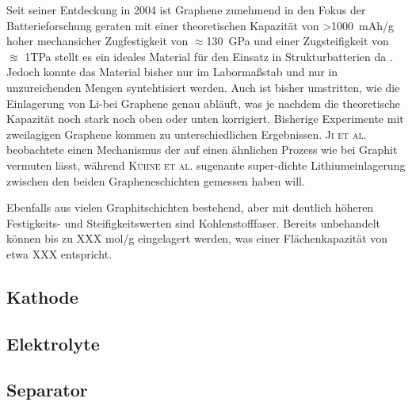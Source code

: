 Seit seiner Entdeckung in 2004 \cite{Novoselov2004} ist Graphene zunehmend in den Fokus der Batterieforschung geraten mit einer theoretischen Kapazität von >1000~mAh/g hoher mechansicher Zugfestigkeit von $\approx$130~GPa und einer Zugsteifigkeit von $\approxeq$ 1TPa stellt es ein ideales Material für den Einsatz in Strukturbatterien da \cite{Novoselov2012}. Jedoch konnte das Material bisher nur im Labormaßstab und nur in unzureichenden Mengen syntehtisiert werden. Auch ist bisher umstritten, wie die Einlagerung von Li-bei Graphene genau abläuft, was je nachdem die theoretische Kapazität noch stark noch oben oder unten korrigiert. Bisherige Experimente mit zweilagigen Graphene kommen zu unterschiedlichen Ergebnissen. \textsc{Ji et al.} beobachtete einen Mechanismus der auf einen ähnlichen Prozess wie bei Graphit vermuten lässt, während \textsc{Kühne et al.} sugenante super-dichte Lithiumeinlagerung zwischen den beiden Grapheneschichten gemessen haben will. 

Ebenfalls aus vielen Graphitschichten bestehend, aber mit deutlich höheren Festigkeits- und Steifigkeitswerten sind Kohlenstofffaser. Bereits unbehandelt können bis zu XXX mol/g eingelagert werden, was einer Flächenkapazität von etwa XXX entspricht.



\subsection{Kathode}
\subsection{Elektrolyte}
\subsection{Separator}



